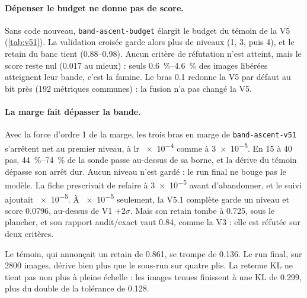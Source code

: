 \documentclass[11pt,a4paper]{article}
\newcommand{\code}[1]{\texttt{#1}}
\begin{document}
\paragraph{Dépenser le budget ne donne pas de score.} Sans code nouveau, \code{band-ascent-budget}
élargit le budget du témoin de la V5 (\cref{tab:v51}). La validation croisée garde alors plus de
niveaux (1, 3, puis 4), et le retain du banc tient (\numrange{0.88}{0.98}). Aucun critère de
réfutation n'est atteint, mais le score reste nul (\num{0.017} au mieux) : seuls
\SIrange{0.6}{4.6}{\percent} des images libérées atteignent leur bande, c'est la famine. Le bras
\num{0.1} redonne la V5 par défaut au bit près (192 métriques communes) : la fusion n'a pas changé la
V5.

\paragraph{La marge fait dépasser la bande.} Avec la force d'ordre 1 de la marge, les trois bras en
marge de \code{band-ascent-v51} s'arrêtent net au premier niveau, à lr \num{e-4} comme à
\num{3e-5}. En 15 à 40 pas, \SIrange{44}{74}{\percent} de la sonde passe au-dessus de sa borne, et
la dérive du témoin dépasse son arrêt dur. Aucun niveau n'est gardé : le run final ne bouge pas le
modèle. La fiche prescrivait de refaire à \num{3e-5} avant d'abandonner, et le suivi ajoutait
\num{e-5}. À \num{e-5} seulement, la V5.1 complète garde un niveau et score \num{0.0796}, au-dessus
de V1 $+2\sigma$. Mais son retain tombe à \num{0.725}, sous le plancher, et son rapport audit/exact
vaut \num{0.84}, comme la V3 : elle est réfutée sur deux critères.

Le témoin, qui annonçait un retain de \num{0.861}, se trompe de \num{+0.136}. Le run final, sur
2800 images, dérive bien plus que le sous-run sur quatre plis. La retenue KL ne tient pas non plus à
pleine échelle : les images tenues finissent à une KL de \num{0.299}, plus du double de la tolérance
de \num{0.128}.
\end{document}
